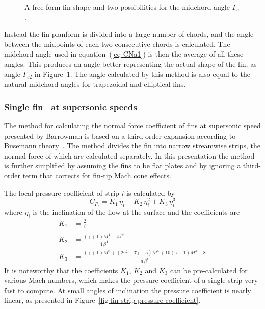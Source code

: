 \begin{figure}
\centering
{}
\caption{A free-form fin shape and two possibilities for the midchord
  angle $\Gamma_c$.}
\label{fig-midchord-angle}
\end{figure}

Instead the fin planform is divided into a large number of chords, and
the angle between the midpoints of each two consecutive chords is
calculated.  The midchord angle used in equation~(\ref{eq-CNa1}) is
then the average of all these angles.  This produces an angle better
representing the actual shape of the fin, as angle $\Gamma_{c2}$ in
Figure~\ref{fig-midchord-angle}.  The angle calculated by this method
is also equal to the natural midchord angles for trapezoidal and
elliptical fins.




\subsubsection{Single fin \CNa\ at supersonic speeds}
\label{sec-single-fin-CNa-supersonic}

The method for calculating the normal force coefficient of fins at
supersonic speed presented by Barrowman is based on a third-order
expansion according to Busemann theory~\cite{barrowman-fin}.  The
method divides the fin into narrow streamwise strips, the normal force
of which are calculated separately.  In this presentation the method
is further simplified by assuming the fins to be flat plates and by
ignoring a third-order term that corrects for fin-tip Mach cone
effects.

%
%


The local pressure coefficient of strip $i$ is calculated by
%
\begin{equation}
C_{P_i} = K_1 \,\eta_i + K_2 \,\eta_i^2 + K_3 \,\eta_i^3
\label{eq-local-pressure-coefficient}
\end{equation}
%
where $\eta_i$ is the inclination of the flow at the surface and the
coefficients are
%
\begin{align}
K_1 &= \frac{2}{\beta} \\
K_2 &= \frac{(\gamma+1)M^4 - 4\,\beta^2}{4\,\beta^4} \\
K_3 &= \frac{(\gamma+1)M^8 + (2\gamma^2-7\gamma-5)M^6 +
  10(\gamma+1)M^4 + 8}{6\,\beta^7}
\end{align}
%
It is noteworthy that the coefficients $K_1$, $K_2$ and $K_3$ can be
pre-calculated for various Mach numbers, which makes the pressure
coefficient of a single strip very fast to compute.  At small
angles of inclination the pressure coefficient is nearly linear, as
presented in Figure~\ref{fig-fin-strip-pressure-coefficient}.


